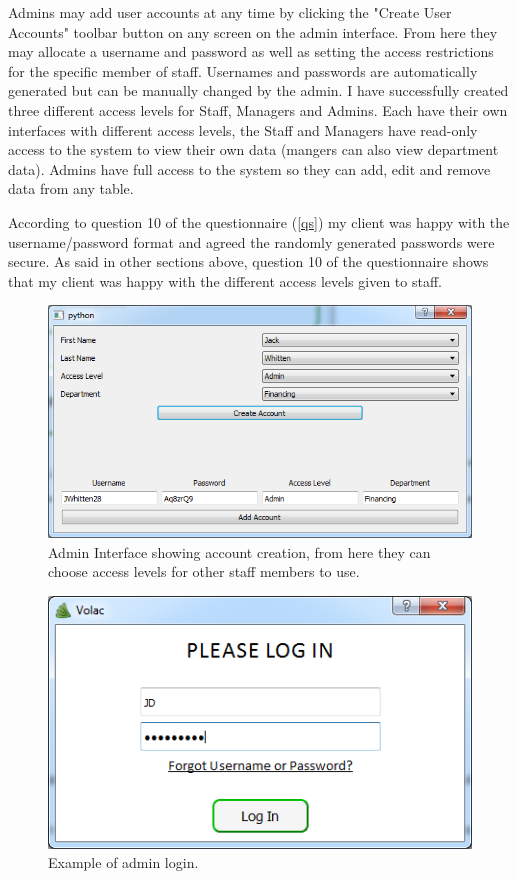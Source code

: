 Admins may add user accounts at any time by clicking the "Create User Accounts" toolbar button on any screen on the admin interface. From here they may allocate a username and password as well as setting the access restrictions for the specific member of staff. Usernames and passwords are automatically generated but can be manually changed by the admin. I have successfully created three different access levels for Staff, Managers and Admins. Each have their own interfaces with different access levels, the Staff and Managers have read-only access to the system to view their own data (mangers can also view department data). Admins have full access to the system so they can add, edit and remove data from any table.

According to question 10 of the questionnaire (\ref{qs}) my client was happy with the username/password format and agreed the randomly generated passwords were secure. As said in other sections above, question 10 of the questionnaire shows that my client was happy with the different access levels given to staff.


\begin{figure}[H]
    \includegraphics[width=\textwidth]{./Evaluation/Images/login1.png}
    \caption{Admin Interface showing account creation, from here they can choose access levels for other staff members to use.} 
\end{figure}

\begin{figure}[H]
    \includegraphics[width=\textwidth]{./Evaluation/Images/login2.png}
    \caption{Example of admin login.} 
\end{figure}

